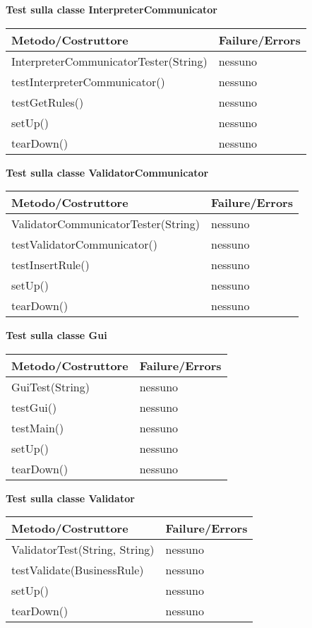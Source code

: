 \textbf{Test sulla classe InterpreterCommunicator}\\
\begin{center}
\begin{tabular}{|p{}|p{3 cm}|} \hline
\textbf{Metodo/Costruttore} & \textbf{Failure/Errors} \\ \hline
InterpreterCommunicatorTester(String) & nessuno \\ \hline
testInterpreterCommunicator() & nessuno \\ \hline
testGetRules() & nessuno \\ \hline
setUp() & nessuno \\ \hline
tearDown() & nessuno \\ \hline
\end{tabular}
\end{center}

\textbf{Test sulla classe ValidatorCommunicator}\\
\begin{center}
\begin{tabular}{|p{}|p{3 cm}|} \hline
\textbf{Metodo/Costruttore} & \textbf{Failure/Errors} \\ \hline
ValidatorCommunicatorTester(String) & nessuno \\ \hline
testValidatorCommunicator() & nessuno \\ \hline
testInsertRule() & nessuno \\ \hline
setUp() & nessuno \\ \hline
tearDown() & nessuno \\ \hline
\end{tabular}
\end{center}


\textbf{Test sulla classe Gui}\\
\begin{center}
\begin{tabular}{|p{}|p{3 cm}|} \hline
\textbf{Metodo/Costruttore} & \textbf{Failure/Errors} \\ \hline
GuiTest(String) & nessuno \\ \hline
testGui() & nessuno \\ \hline
testMain() & nessuno \\ \hline
setUp() & nessuno \\ \hline
tearDown() & nessuno \\ \hline
\end{tabular}
\end{center}

\textbf{Test sulla classe Validator}\\
\begin{center}
\begin{tabular}{|p{}|p{3 cm}|} \hline
\textbf{Metodo/Costruttore} & \textbf{Failure/Errors} \\ \hline
ValidatorTest(String, String) & nessuno \\ \hline
testValidate(BusinessRule) & nessuno \\ \hline
setUp() & nessuno \\ \hline
tearDown() & nessuno \\ \hline
\end{tabular}
\end{center}


